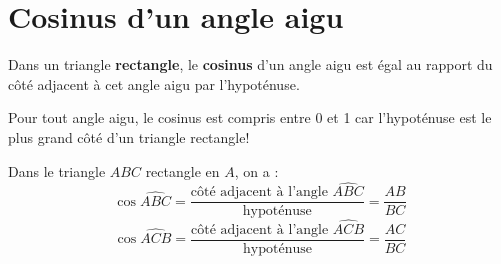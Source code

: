 \section{Cosinus d'un angle aigu}
\begin{definition}
    Dans un triangle {\bfseries rectangle}, le \textbf{cosinus} d'un angle aigu est égal au rapport du côté adjacent à cet angle aigu par l'hypoténuse.
\end{definition}

\begin{remarque}
    Pour tout angle aigu, le cosinus est compris entre 0 et 1 car l'hypoténuse est le plus grand côté d'un triangle rectangle!
\end{remarque}

\begin{exemples*1}

    \medskip
    Dans le triangle $ABC$ rectangle en $A$, on a : 
    $$\cos\widehat{ABC}=\frac{\mbox{côté adjacent à l'angle $\widehat{ABC}$}}{\mbox{hypoténuse}}=\frac{AB}{BC}$$
    $$\cos\widehat{ACB}=\frac{\mbox{côté adjacent à l'angle $\widehat{ACB}$}}{\mbox{hypoténuse}}=\frac{AC}{BC}$$
\end{exemples*1}
